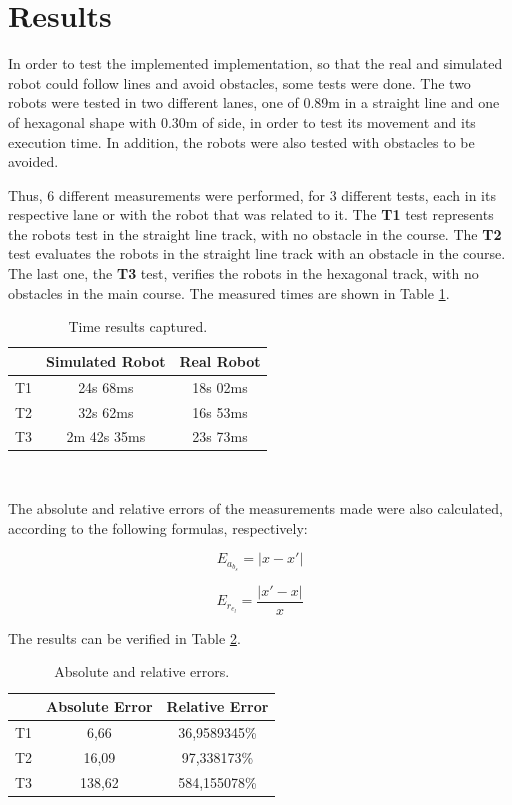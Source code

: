 \documentclass[conference]{IEEEtran}
\begin{document}
\section{Results} \label{results}

In order to test the implemented implementation, so that the real and simulated robot could follow lines and avoid obstacles, some tests were done. The two robots were tested in two different lanes, one of 0.89m in a straight line and one of hexagonal shape with 0.30m of side, in order to test its movement and its execution time. In addition, the robots were also tested with obstacles to be avoided.

Thus, 6 different measurements were performed, for 3 different tests, each in its respective lane or with the robot that was related to it. The \textbf{T1} test represents the robots test in the straight line track, with no obstacle in the course. The \textbf{T2} test evaluates the robots in the straight line track with an obstacle in the course. The last one, the \textbf{T3} test, verifies the robots in the hexagonal track, with no obstacles in the main course. The measured times are shown in Table \ref{tab:tab1}.

\begin{table}[H]
\begin{center}
\begin{tabular}{ c c c }
\hline
  & Simulated Robot & Real Robot \\ 
 \hline
 T1 & 24s 68ms & 18s 02ms \\  
 T2 & 32s 62ms & 16s 53ms \\
 T3 & 2m 42s 35ms & 23s 73ms \\
 \hline
\end{tabular}
\caption{Time results captured.\label{tab:tab1}}\\
\end{center}
\end{table}

The absolute and relative errors of the measurements made were also calculated, according to the following formulas, respectively:

\[
    E_a_b_s = |x - x'|
\]

\[
    E_r_e_l = \frac{|x'- x|}{x}
\]

The results can be verified in Table \ref{tab:tab2}.

\begin{table}[H]
\begin{center}
\begin{tabular}{ c c c }
\hline
  & Absolute Error & Relative Error \\ 
 \hline
 T1 & 6,66 & 36,9589345\% \\  
 T2 & 16,09 & 97,338173\%  \\
 T3 & 138,62 & 584,155078\%  \\
 \hline
\end{tabular}
\caption{Absolute and relative errors.}
\label{tab:tab2}
\end{center}
\end{table}
\end{document}
